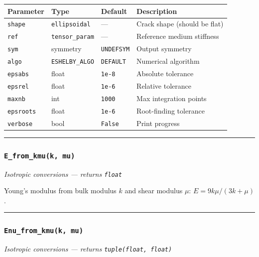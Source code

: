 \documentclass[
  a4paper,
  numbers=noendperiod,
  DIV=12]{scrreprt}
\newcounter{none} %
\begin{document}
{\def\LTcaptype{none} %
\begin{longtable}[]{@{}llll@{}}
\toprule\noalign{}
Parameter & Type & Default & Description \\
\midrule\noalign{}
\endhead
\bottomrule\noalign{}
\endlastfoot
\texttt{shape} & \texttt{ellipsoidal} & --- & Crack shape (should be
flat) \\
\texttt{ref} & \texttt{tensor\_param} & --- & Reference medium
stiffness \\
\texttt{sym} & symmetry & \texttt{UNDEFSYM} & Output symmetry \\
\texttt{algo} & \texttt{ESHELBY\_ALGO} & \texttt{DEFAULT} & Numerical
algorithm \\
\texttt{epsabs} & float & \texttt{1e-8} & Absolute tolerance \\
\texttt{epsrel} & float & \texttt{1e-6} & Relative tolerance \\
\texttt{maxnb} & int & \texttt{1000} & Max integration points \\
\texttt{epsroots} & float & \texttt{1e-6} & Root-finding tolerance \\
\texttt{verbose} & bool & \texttt{False} & Print progress \\
\end{longtable}
}

\begin{center}\rule{0.5\linewidth}{0.5pt}\end{center}

\subsubsection{\texorpdfstring{\texttt{E\_from\_kmu(k,\ mu)}}{E\_from\_kmu(k, mu)}}\label{api-e-from-kmu}

\emph{Isotropic conversions --- returns \texttt{float}}

Young's modulus from bulk modulus \(k\) and shear modulus \(\mu\):
\(E = 9k\mu/(3k+\mu)\).

\begin{center}\rule{0.5\linewidth}{0.5pt}\end{center}

\subsubsection{\texorpdfstring{\texttt{Enu\_from\_kmu(k,\ mu)}}{Enu\_from\_kmu(k, mu)}}\label{api-enu-from-kmu}

\emph{Isotropic conversions --- returns \texttt{tuple(float,\ float)}}
\end{document}
